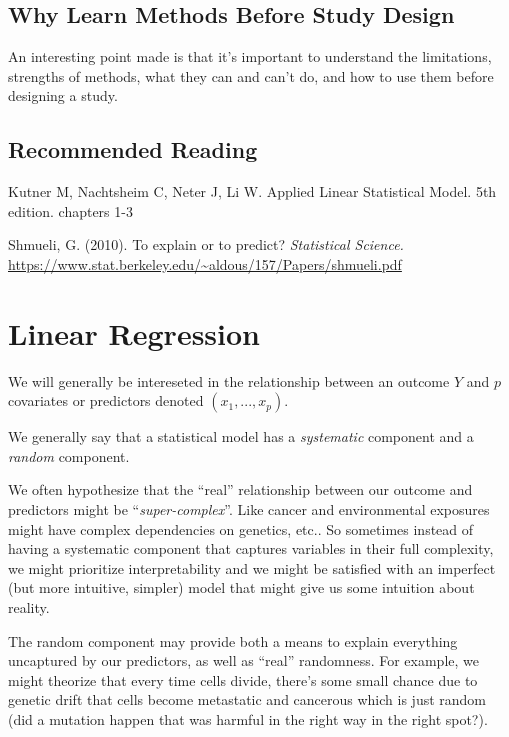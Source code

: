 \documentclass[
  letterpaper,
  DIV=11,
  numbers=noendperiod]{scrreport}
\begin{document}
\hypertarget{why-learn-methods-before-study-design}{%
\section{Why Learn Methods Before Study
Design}\label{why-learn-methods-before-study-design}}

An interesting point made is that it's important to understand the
limitations, strengths of methods, what they can and can't do, and how
to use them before designing a study.

\hypertarget{recommended-reading}{%
\section{Recommended Reading}\label{recommended-reading}}

Kutner M, Nachtsheim C, Neter J, Li W. Applied Linear Statistical Model.
5th edition. chapters 1-3

Shmueli, G. (2010). To explain or to predict? \emph{Statistical
Science.}
\url{https://www.stat.berkeley.edu/~aldous/157/Papers/shmueli.pdf}


\hypertarget{linear-regression}{%
\chapter{Linear Regression}\label{linear-regression}}

We will generally be intereseted in the relationship between an outcome
\(Y\) and \(p\) covariates or predictors denoted \((x_1, ..., x_p)\).

We generally say that a statistical model has a \emph{systematic}
component and a \emph{random} component.

We often hypothesize that the ``real'' relationship between our outcome
and predictors might be ``\emph{super-complex}''. Like cancer and
environmental exposures might have complex dependencies on genetics,
etc.. So sometimes instead of having a systematic component that
captures variables in their full complexity, we might prioritize
interpretability and we might be satisfied with an imperfect (but more
intuitive, simpler) model that might give us some intuition about
reality.

The random component may provide both a means to explain everything
uncaptured by our predictors, as well as ``real'' randomness. For
example, we might theorize that every time cells divide, there's some
small chance due to genetic drift that cells become metastatic and
cancerous which is just random (did a mutation happen that was harmful
in the right way in the right spot?).
\end{document}
